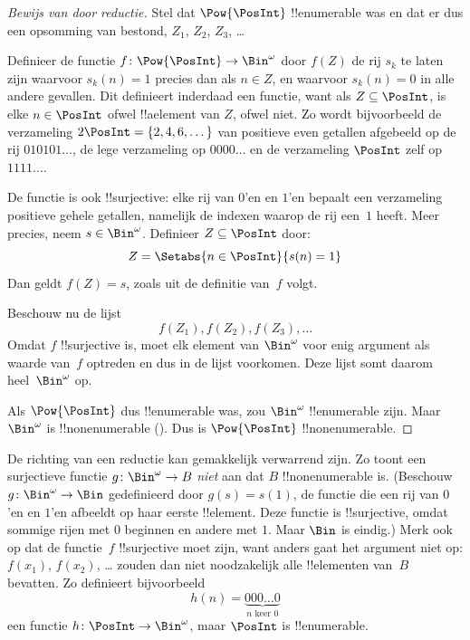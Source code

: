 \documentclass[../../../include/open-logic-section]{subfiles}
\begin{document}
\begin{proof}[Bewijs van {} door reductie]
Stel dat $\Pow{\PosInt}$ !!{enumerable} was en dat er dus een
opsomming van bestond, $Z_{1}$, $Z_{2}$, $Z_{3}$, \dots

Definieer de functie $f \colon \Pow{\PosInt} \to \Bin^\omega$ door
$f(Z)$ de rij $s_{k}$ te laten zijn waarvoor $s_{k}(n) = 1$ precies
dan als $n \in Z$, en waarvoor $s_k(n) = 0$ in alle andere gevallen.
Dit definieert inderdaad een functie, want als $Z \subseteq \PosInt$,
is elke $n \in \PosInt$ ofwel !!a{element} van $Z$, ofwel niet. Zo
wordt bijvoorbeeld de verzameling $2\PosInt = \{2, 4, 6, \dots\}$ van
positieve even getallen afgebeeld op de rij $010101\dots$, de lege
verzameling op $0000\dots$ en de verzameling $\PosInt$ zelf op
$1111\dots$.

De functie is ook !!{surjective}: elke rij van $0$'en en $1$'en bepaalt
een verzameling positieve gehele getallen, namelijk de indexen waarop de
rij een~$1$ heeft. Meer precies, neem $s \in \Bin^\omega$. Definieer
$Z \subseteq \PosInt$ door:
\[
Z = \Setabs{n \in \PosInt}{s(n) = 1}
\]
Dan geldt $f(Z) = s$, zoals uit de definitie van~$f$ volgt.

Beschouw nu de lijst
\[
f(Z_1), f(Z_2), f(Z_3), \dots
\]
Omdat $f$ !!{surjective} is, moet elk element van $\Bin^\omega$ voor
enig argument als waarde van~$f$ optreden en dus in de lijst voorkomen.
Deze lijst somt daarom heel~$\Bin^\omega$ op.

Als $\Pow{\PosInt}$ dus !!{enumerable} was, zou $\Bin^\omega$
!!{enumerable} zijn. Maar $\Bin^\omega$ is !!{nonenumerable}
(). Dus is $\Pow{\PosInt}$
!!{nonenumerable}.
\end{proof}

\begin{explain}
De richting van een reductie kan gemakkelijk verwarrend zijn. Zo toont
een surjectieve functie $g \colon
\Bin^\omega \to B$ 
\emph{niet} aan dat $B$ !!{nonenumerable} is. (Beschouw $g \colon
\Bin^\omega \to \Bin$ gedefinieerd door $g(s) = s(1)$, de functie die
een rij van $0$'en en $1$'en afbeeldt op haar eerste !!{element}. Deze
functie is !!{surjective}, omdat sommige rijen met $0$ beginnen en
andere met $1$. Maar $\Bin$ is eindig.) Merk ook op dat de functie~$f$
!!{surjective} moet zijn, want anders gaat het argument niet op:
$f(x_1)$, $f(x_2)$, \dots{} zouden dan niet noodzakelijk alle
!!{element}en van~$B$ bevatten. Zo definieert bijvoorbeeld
\[
h(n) = \underbrace{000\dots0}_{\text{$n$ keer $0$}}
\]
een functie $h\colon \PosInt \to \Bin^\omega$, maar $\PosInt$ is
!!{enumerable}.
\end{explain}
\end{document}
